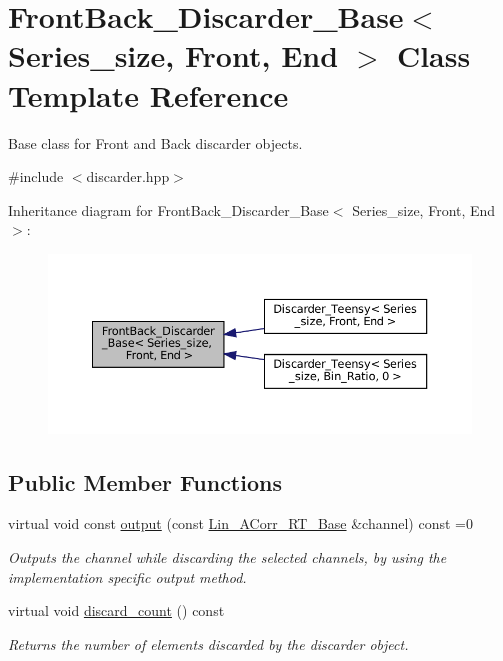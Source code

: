 \hypertarget{classFrontBack__Discarder__Base}{}\section{Front\+Back\+\_\+\+Discarder\+\_\+\+Base$<$ Series\+\_\+size, Front, End $>$ Class Template Reference}
\label{classFrontBack__Discarder__Base}


Base class for Front and Back discarder objects.  




{\ttfamily \#include $<$discarder.\+hpp$>$}



Inheritance diagram for Front\+Back\+\_\+\+Discarder\+\_\+\+Base$<$ Series\+\_\+size, Front, End $>$\+:
\nopagebreak
\begin{figure}[H]
\begin{center}
\leavevmode
\includegraphics[width=350pt]{classFrontBack__Discarder__Base__inherit__graph}
\end{center}
\end{figure}
\subsection*{Public Member Functions}
\begin{DoxyCompactItemize}
\item 
virtual void const \hyperlink{classFrontBack__Discarder__Base_ab8a1d0082f223c31da3c1374c520c4c4}{output} (const \hyperlink{classLin__ACorr__RT__Base}{Lin\+\_\+\+A\+Corr\+\_\+\+R\+T\+\_\+\+Base} \&channel) const =0
\begin{DoxyCompactList}\small\item\em Outputs the channel while discarding the selected channels, by using the implementation specific output method. \end{DoxyCompactList}\item 
virtual void \hyperlink{classFrontBack__Discarder__Base_a3d996834bae795ee0242c0344a2bdfdd}{discard\+\_\+count} () const
\begin{DoxyCompactList}\small\item\em Returns the number of elements discarded by the discarder object. \end{DoxyCompactList}\end{DoxyCompactItemize}


